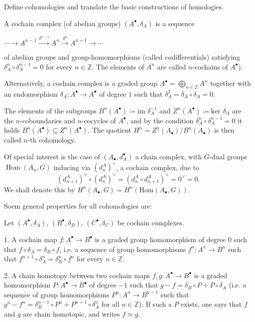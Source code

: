 Define cohomologies and translate the basic constructions of homologies.

A cochain complex (of abelian groups) \( (A^\bullet, \delta_A) \) is a sequence 

\(\cdots \xrightarrow{} A^{n-1} \xrightarrow{\delta^{n-1}} A^n \xrightarrow{\delta^{n}} A^{n+1} \xrightarrow{} \cdots\)

of abelian groups and group-homomorphisms (called codifferentials) satisfying \( \delta_A^n \circ \delta_A^{n-1} = 0 \)
for every \( n \in \mathbb{Z} \). The elements of \( A^n \) are called \(n\)-cochains of \(A^\bullet\)). 

Alternatively, a cochain complex is a graded group \(A^\bullet = \bigoplus_{n \in \mathbb{Z}} A^n\)
together with an endomorphism \(\delta_A : A^\bullet \to A^\bullet\) of degree \( 1 \) such that \(\delta_A^2 = \delta_A \circ \delta_A = 0\).

The elements of the subgroups \( B^n(A^\bullet) \coloneqq \text{im } \delta_A^{-1} \) and \( Z^n(A^\bullet) \coloneqq \text{ker } \delta_A \) 
are the \( n \)-coboundaries and \( n \)-cocycles of \( A^\bullet \), and by the condition \( \delta^n_A \circ \delta^{n-1}_A = 0\)
it holds \( B^n(A^\bullet) \subseteq Z^n(A^\bullet) \). The quotient \( H^n = Z^n(A_\bullet) / B^n(A_\bullet) \) is then called 
\( n \)-th cohomology.

Of special interest is the case of \((A_\bullet, d_A^\bullet)\) a chain complex, with \( G \)-dual groups \(\operatorname{Hom}(A_n, G)\) inducing via
\((d_n^A)^\vee\), a cochain complex, due to
\[
(d_{n+1}^A)^\vee \circ (d_n^A)^\vee = (d_n^A \circ d_{n+1}^A)^\vee = 0^\vee = 0.
\]
We shall denote this by \( H^n(A_\bullet, G) = H^n(\text{Hom}(A_\bullet, G)) \).

Soem general properties for all cohomologies are:

Let \( (A^\bullet, \delta_A) \), \( (B^\bullet, \delta_B) \), \((C^\bullet, \delta_C)\) be cochain complexes.

1. A cochain map \(f \colon A^\bullet \to B^\bullet\) is a graded group homomorphism of degree 0 such that 
\(f \circ \delta_A = \delta_B \circ f\), i.e. a sequence of group homomorphisms \(f^n \colon A^n \to B^n\) 
such that \(f^{n+1} \circ \delta_A^n = \delta_B^n \circ f^n\) for every \(n \in \mathbb{Z}\).

2. A chain homotopy between two cochain maps \(f, g \colon A^\bullet \to B^\bullet\) is a graded homomorphism 
\(P \colon A^\bullet \to B^\bullet\) of degree \(-1\) such that \(g - f = \delta_B \circ P + P \circ \delta_A\) 
(i.e. a sequence of group homomorphisms \(P^n \colon A^n \to B^{n-1}\) such that 
\(g^n - f^n = \delta_B^{n-1} \circ P^n + P^{n+1} \circ \delta_A^n\) for all \(n \in \mathbb{Z}\)). 
If such a \(P\) exists, one says that \(f\) and \(g\) are chain homotopic, and writes \(f \simeq g\).

